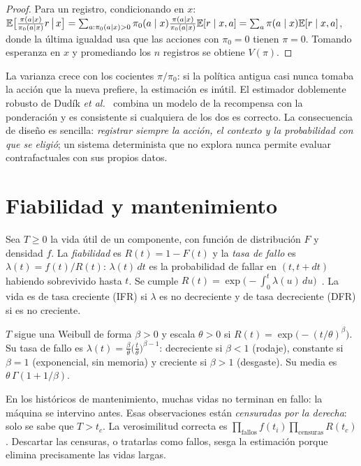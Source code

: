 \begin{proof}
Para un registro, condicionando en $x$:
$\mathbb{E}\bigl[\tfrac{\pi(a\mid x)}{\pi_0(a\mid x)}r\,\big|\,x\bigr]=\sum_{a:\pi_0(a\mid x)>0}\pi_0(a\mid x)\tfrac{\pi(a\mid x)}{\pi_0(a\mid x)}\mathbb{E}[r\mid x,a]=\sum_{a}\pi(a\mid x)\mathbb{E}[r\mid x,a]$, donde la última igualdad usa que las acciones con $\pi_0=0$ tienen $\pi=0$. Tomando esperanza en $x$ y promediando los $n$ registros se obtiene $V(\pi)$.
\end{proof}

La varianza crece con los cocientes $\pi/\pi_0$: si la política antigua casi nunca tomaba la acción que la nueva prefiere, la estimación es inútil. El estimador doblemente robusto de Dudík \emph{et al.}~\cite{dudik} combina un modelo de la recompensa con la ponderación y es consistente si cualquiera de los dos es correcto. La consecuencia de diseño es sencilla: \emph{registrar siempre la acción, el contexto y la probabilidad con que se eligió}; un sistema determinista que no explora nunca permite evaluar contrafactuales con sus propios datos.

\section{Fiabilidad y mantenimiento}

\begin{definicion}\label{def:fiabilidad}
Sea $T\ge0$ la vida útil de un componente, con función de distribución $F$ y densidad $f$. La \emph{fiabilidad} es $R(t)=1-F(t)$ y la \emph{tasa de fallo} es $\lambda(t)=f(t)/R(t)$: $\lambda(t)\,dt$ es la probabilidad de fallar en $(t,t+dt)$ habiendo sobrevivido hasta $t$. Se cumple $R(t)=\exp\bigl(-\int_0^t\lambda(u)\,du\bigr)$~\cite{mit1010}. La vida es de tasa creciente (IFR) si $\lambda$ es no decreciente y de tasa decreciente (DFR) si es no creciente.
\end{definicion}

\begin{definicion}\label{def:weibull}
$T$ sigue una Weibull de forma $\beta>0$ y escala $\theta>0$ si $R(t)=\exp\bigl(-(t/\theta)^{\beta}\bigr)$. Su tasa de fallo es $\lambda(t)=\frac{\beta}{\theta}\bigl(\frac{t}{\theta}\bigr)^{\beta-1}$: decreciente si $\beta<1$ (rodaje), constante si $\beta=1$ (exponencial, sin memoria) y creciente si $\beta>1$ (desgaste). Su media es $\theta\,\Gamma(1+1/\beta)$.
\end{definicion}

\begin{observacion}[Censura]\label{obs:censura}
En los históricos de mantenimiento, muchas vidas no terminan en fallo: la máquina se intervino antes. Esas observaciones están \emph{censuradas por la derecha}: solo se sabe que $T>t_c$. La verosimilitud correcta es $\prod_{\text{fallos}}f(t_i)\prod_{\text{censuras}}R(t_c)$. Descartar las censuras, o tratarlas como fallos, sesga la estimación porque elimina precisamente las vidas largas.
\end{observacion}

